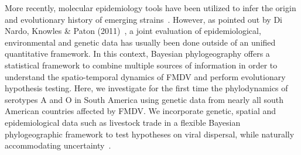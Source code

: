 \documentclass[10pt]{article}
\begin{document}
More recently, molecular epidemiology tools have been utilized to infer the origin and evolutionary history of emerging strains~\cite{Perez2001, Malirat2007, andean, Malirat2011, Maradei2013}.
However, as pointed out by Di Nardo, Knowles \&  Paton (2011)~\cite{combining}, a joint evaluation of epidemiological, environmental and genetic data has usually been done outside of an unified quantitative framework.
In this context, Bayesian phylogeography offers a statistical framework to combine multiple sources of information in order to understand the spatio-temporal dynamics of FMDV and perform evolutionary hypothesis testing.
Here, we investigate for the first time the phylodynamics of serotypes A and O in South America using genetic data from nearly all south American countries affected by FMDV. 
We incorporate genetic, spatial and epidemiological data such as livestock trade in a flexible Bayesian phylogeographic framework to test hypotheses on viral dispersal, while naturally accommodating uncertainty~\cite{roots,towards}.
\end{document}

